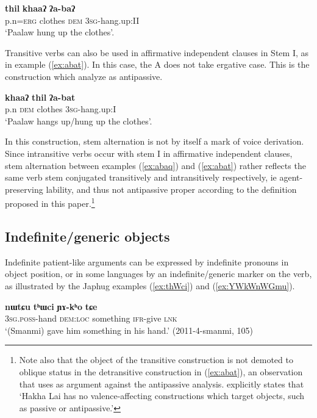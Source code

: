 \documentclass[oneside,a4paper,11pt]{article}
\newcommand{\ipa}[1]{{\phon\textbf{#1}}}
\begin{document}
\begin{exe}
\ex \label{ex:abaq}
\gll \ipa{paalaw=niʔ} \ipa{thil} \ipa{khaaʔ} \ipa{ʔa-baʔ} \\
p.n=\textsc{erg} clothes \textsc{dem} \textsc{3sg}-hang.up:II \\
\glt `Paalaw hung up the clothes'.
\end{exe}

Transitive verbs can also be used in affirmative independent clauses in Stem I, as in example (\ref{ex:abat}). In this case, the A does not take ergative case. This is the construction which \citet{kathol01alternations} analyze as antipassive.

\begin{exe}
\ex \label{ex:abat}
\gll \ipa{paalaw} \ipa{khaaʔ}  \ipa{thil} \ipa{ʔa-bat} \\
p.n \textsc{dem} clothes \textsc{3sg}-hang.up:I \\
\glt `Paalaw hangs up/hung up the clothes'.
\end{exe}

In this construction, stem alternation is not by itself a mark of voice derivation. Since intransitive verbs occur with stem I in affirmative independent clauses, stem alternation between examples (\ref{ex:abaq}) and (\ref{ex:abat}) rather reflects the same verb stem conjugated transitively and intransitively respectively, ie agent-preserving lability, and thus not antipassive proper according to the definition proposed in this paper.\footnote{Note also that the object of the transitive construction is not demoted to oblique status in the detransitive construction in (\ref{ex:abat}), an observation that \citet[413]{peterson03hakha} uses as argument against the antipassive analysis. \citet[37]{peterson07appl} explicitly states that `Hakha Lai has no valence-affecting constructions which target objects, such as passive or antipassive.'} 
 
\subsection{Indefinite/generic objects} \label{sec:indef}
Indefinite patient-like arguments can be expressed by indefinite pronouns in object position, or in some languages by an indefinite/generic marker on the verb, as illustrated by the Japhug examples (\ref{ex:thWci}) and (\ref{ex:YWkWnWGmu}).

\begin{exe}
\ex  \label{ex:thWci}
\gll \ipa{ɯ-jaʁ} \ipa{nɯtɕu} \ipa{tʰɯci} \ipa{ɲɤ-kʰo} \ipa{tɕe} \\
\textsc{3sg.poss}-hand \textsc{dem:loc} something \textsc{ifr}-give \textsc{lnk} \\
\glt `(Smanmi) gave him something in his hand.' (2011-4-smanmi, 105)
\end{exe}
\end{document}

